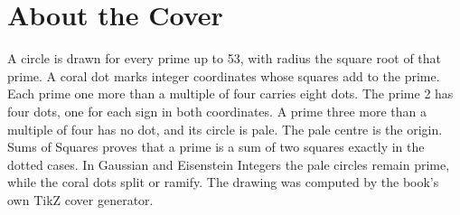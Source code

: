 \backmatter
\cleardoublepage
\chapter*{About the Cover}
\noindent A circle is drawn for every prime up to 53, with radius the square root of that prime. A coral dot marks integer coordinates whose squares add to the prime. Each prime one more than a multiple of four carries eight dots. The prime 2 has four dots, one for each sign in both coordinates. A prime three more than a multiple of four has no dot, and its circle is pale. The pale centre is the origin. Sums of Squares proves that a prime is a sum of two squares exactly in the dotted cases. In Gaussian and Eisenstein Integers the pale circles remain prime, while the coral dots split or ramify. The drawing was computed by the book's own TikZ cover generator.

